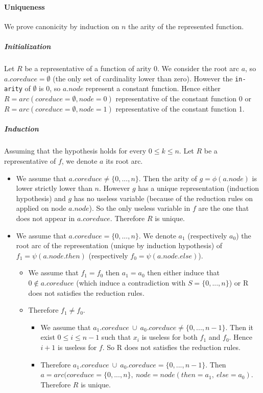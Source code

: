 \documentclass[a4paper,10pt]{article}
\begin{document}
\paragraph{Uniqueness}
We prove canonicity by induction on $n$ the arity of the represented function.
\subparagraph{Initialization}
Let $R$ be a representative of a function of arity 0. We consider the root arc $a$, so $a.coreduce = \emptyset$ (the only set of cardinality lower than zero). However the \texttt{in-arity} of $\emptyset$ is 0, so $a.node$ represent a constant function. Hence either $R = arc(coreduce = \emptyset, node = 0)$ representative of the constant function 0 or $R = arc(coreduce = \emptyset, node = 1)$ representative of the constant function 1.
\subparagraph{Induction}
Assuming that the hypothesis holds for every $0\leq k\leq n$.
Let $R$ be a representative of $f$, we denote $a$ its root arc.
\begin{itemize}
  \item We assume that $a.coreduce \neq \{0, ..., n\}$. Then the arity of $g = \phi(a.node)$ is lower strictly lower than $n$. However $g$ has a unique representation (induction hypothesis) and $g$ has no useless variable (because of the reduction rules on applied on node $a.node$). So the only useless variable in $f$ are the one that does not appear in $a.coreduce$. Therefore $R$ is unique.
  \item We assume that $a.coreduce = \{0, ..., n\}$. We denote $a_1$ (respectively $a_0$) the root arc of the representation (unique by induction hypothesis) of $f_1 = \psi(a.node.then)$ (respectively $f_0 = \psi(a.node.else)$).\begin{itemize}
    \item We assume that $f_1 = f_0$ then $a_1 = a_0$ then either induce that $0\not\in a.coreduce$ (which induce a contradiction with $S=\{0, ..., n\}$) or R does not satisfies the reduction rules.
    \item Therefore $f_1\neq f_0$.\begin{itemize}
      \item We assume that $a_1.coreduce~\cup~a_0.coreduce \neq \{0, ..., n-1\}$. Then it exist $0\leq i\leq n-1$ such that $x_i$ is useless for both $f_1$ and $f_0$. Hence $i+1$ is useless for $f$. So R does not satisfies the reduction rules.
      \item Therefore $a_1.coreduce~\cup~a_0.coreduce = \{0, ..., n-1\}$. Then $a = arc ( coreduce = \{0, ..., n\},~node = node(then = a_1,~else = a_0)$. Therefore $R$ is unique.
    \end{itemize}
  \end{itemize}
\end{itemize}
\end{document}
